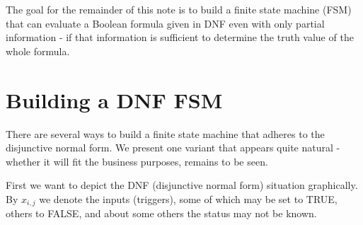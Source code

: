 \documentclass[12pt]{amsart}
\begin{document}
The goal for the remainder of this note is to build a finite state
machine (FSM) that can evaluate a Boolean formula given in DNF
even with only partial information - if that information is sufficient
to determine the truth value of the whole formula.

\section{Building a DNF FSM}\label{fsm1}

There are several ways to build a finite state machine that
adheres to the disjunctive normal form. We present one
variant that appears quite natural - whether it 
will fit the business purposes, remains to be seen.

First we want to depict the DNF (disjunctive normal form) situation
graphically. By $x_{i,j}$ we denote the inputs (triggers),
some of which may be set to TRUE, others to FALSE, and
about some others the status may not be known.

\vspace*{3mm}
\end{document}
